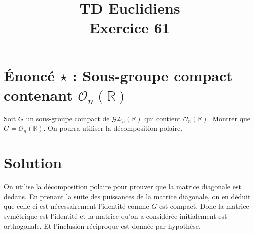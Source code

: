 \documentclass[french]{article}
\title{TD Euclidiens\\ Exercice 61}
\date{}
\newcommand{\R}{\mathbb{R}}
\begin{document}
\maketitle

\section{Énoncé $\star$ : Sous-groupe compact contenant $\mathcal{O}_n(\R)$}
Soit $G$ un sous-groupe compact de $\mathcal{GL}_n(\R)$ qui contient $\mathcal{O}_n(\R)$. Montrer que $G=\mathcal{O}_n(\R)$. On pourra utiliser la décomposition polaire.
\section{Solution}
On utilise la décomposition polaire pour prouver que la matrice diagonale est dedans. En prenant la suite des puissances de la matrice diagonale, on en déduit que celle-ci est nécessairement l'identité comme $G$ est compact. Donc la matrice symétrique est l'identité et la matrice qu'on a considérée initialement est orthogonale. Et l'inclusion réciproque est donnée par hypothèse.
\end{document}
